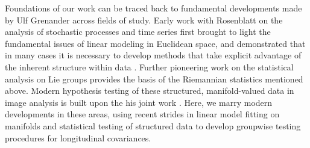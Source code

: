 Foundations of our work can be traced back to fundamental developments made by Ulf Grenander across fields of study. Early work with Rosenblatt on the analysis of stochastic processes and time series first brought to light
the fundamental issues of linear modeling in Euclidean space, and demonstrated that in many cases it is necessary to develop methods that take explicit advantage of the inherent structure within data \citep{grenander1957statistical}.
Further pioneering work on the statistical analysis on Lie groups \citep{grenander2008probabilities} provides the basis of the Riemannian statistics mentioned above.
Modern hypothesis testing of these structured, manifold-valued data in image analysis is built upon the his joint work \citep{grenander1998computational}. Here, we marry modern developments in these areas, using recent strides in linear model fitting on manifolds and statistical testing of structured data to develop groupwise testing procedures for longitudinal covariances.
